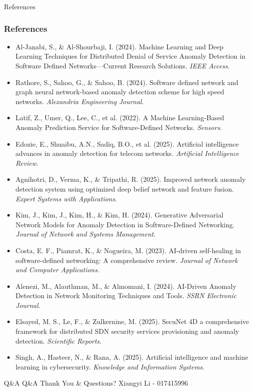\documentclass{beamer}
\begin{document}
\begin{frame}[allowframebreaks]{References}
  \frametitle{References}
  \begin{itemize}
    \item Al-Janabi, S., \& Al-Shourbaji, I. (2024). Machine Learning and Deep Learning Techniques for Distributed Denial of Service Anomaly Detection in Software Defined Networks—Current Research Solutions. \textit{IEEE Access}.
    \item Rathore, S., Sahoo, G., \& Sahoo, B. (2024). Software defined network and graph neural network-based anomaly detection scheme for high speed networks. \textit{Alexandria Engineering Journal}.
    \item Latif, Z., Umer, Q., Lee, C., et al. (2022). A Machine Learning-Based Anomaly Prediction Service for Software-Defined Networks. \textit{Sensors}.
    \item Edozie, E., Shuaibu, A.N., Sadiq, B.O., et al. (2025). Artificial intelligence advances in anomaly detection for telecom networks. \textit{Artificial Intelligence Review}.
    \item Agnihotri, D., Verma, K., \& Tripathi, R. (2025). Improved network anomaly detection system using optimized deep belief network and feature fusion. \textit{Expert Systems with Applications}.
    \item Kim, J., Kim, J., Kim, H., \& Kim, H. (2024). Generative Adversarial Network Models for Anomaly Detection in Software-Defined Networking. \textit{Journal of Network and Systems Management}.
    \item Costa, E. F., Piamrat, K., \& Nogueira, M. (2023). AI-driven self-healing in software-defined networking: A comprehensive review. \textit{Journal of Network and Computer Applications}.
    \item Alenezi, M., Alauthman, M., \& Almomani, I. (2024). AI-Driven Anomaly Detection in Network Monitoring Techniques and Tools. \textit{SSRN Electronic Journal}.
    \item Elsayed, M. S., Le, F., \& Zulkernine, M. (2025). SecuNet 4D a comprehensive framework for distributed SDN security services provisioning and anomaly detection. \textit{Scientific Reports}.
    \item Singh, A., Hasteer, N., \& Rana, A. (2025). Artificial intelligence and machine learning in cybersecurity. \textit{Knowledge and Information Systems}.
  \end{itemize}
\end{frame}

\begin{frame}{Q\&A}
  \centering
  {\Huge Q\&A}
  \vfill
  Thank You \& Questions?
  \vfill
  Xiangyi Li - 017415996
\end{frame}
\end{document}
